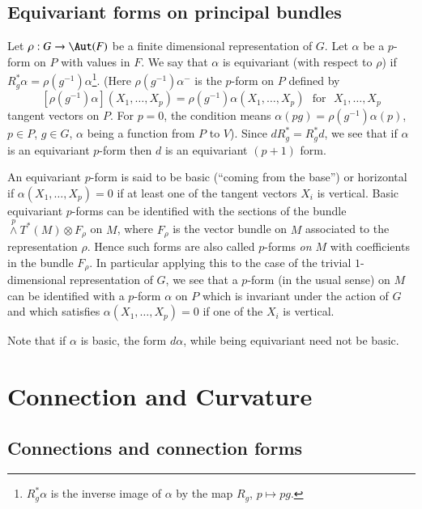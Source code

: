 \subsection*{Equivariant forms on principal bundles}
\pageoriginale

Let $\rho:G\to\Aut (F)$ be a finite dimensional representation of $G$. Let $\alpha$ be a $p$-form on $P$ with values in $F$. We say that $\alpha$ is equivariant (with respect to $\rho$) if $R^{*}_{g}\alpha=\rho(g^{-1})\alpha$\footnote[2]{$R^{*}_{g}\alpha$ is the inverse image of $\alpha$ by the map $R_{g}$, $p\mapsto pg$.}. (Here $\rho(g^{-1})\alpha^{-}$ is the $p$-form on $P$ defined by 
$$
[\rho(g^{-1})\alpha](X_{1},\ldots,X_{p})=\rho(g^{-1})\alpha(X_{1},\ldots,X_{p})\text{~ for~ } X_{1},\ldots,X_{p}
$$
tangent vectors on $P$. For $p=0$, the condition means $\alpha(pg)=\rho(g^{-1})\alpha(p)$, $p\in P$, $g\in G$, $\alpha$ being a function from $P$ to $V$). Since $dR^{*}_{g}=R^{*}_{g}d$, we see that if $\alpha$ is an equivariant $p$-form then $d$ is an equivariant $(p+1)$ form.

An equivariant $p$-form is said to be basic (``coming from the base'') or horizontal if $\alpha(X_{1},\ldots,X_{p})=0$ if at least one of the tangent vectors $X_{i}$ is vertical. Basic equivariant $p$-forms can be identified with the sections of the bundle ${\displaystyle{\mathop{\wedge}\limits^{p}}}T^{*}(M)\otimes F_{\rho}$ on $M$, where $F_{\rho}$ is the vector bundle on $M$ associated to the representation $\rho$. Hence such forms are also called $p$-forms {\em on $M$} with coefficients in the bundle $F_{\rho}$. In particular applying this to the case of the trivial $1$-dimensional representation of $G$, we see that a $p$-form (in the usual sense) on $M$ can be identified with a $p$-form $\alpha$ on $P$ which is invariant under the action of $G$ and which satisfies $\alpha(X_{1},\ldots,X_{p})=0$ if one of the $X_{i}$ is vertical.

Note that if $\alpha$ is basic, the form $d\alpha$, while being equivariant need not be basic.

\section{Connection and Curvature}\label{sec12}

\subsection*{Connections and connection forms}
\pageoriginale

